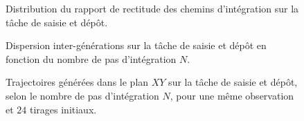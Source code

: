 \begin{figure}[!htbp]
    \centering
    
    \caption{Distribution du rapport de rectitude des chemins d'intégration sur la tâche de saisie et dépôt.}\label{fig:pp_fm_straightness}
\end{figure}

\begin{figure}[!htbp]
    \centering
    
    \caption{Dispersion inter-générations sur la tâche de saisie et dépôt en fonction du nombre de pas d'intégration $N$.}\label{fig:pp_fm_dispersion_pas}
\end{figure}

\begin{figure}[!htbp]
    \centering
    
    \caption{Trajectoires générées dans le plan $XY$ sur la tâche de saisie et dépôt, selon le nombre de pas d'intégration $N$, pour une même observation et $24$ tirages initiaux.}\label{fig:pp_fm_multimodalite_xy}
\end{figure}
